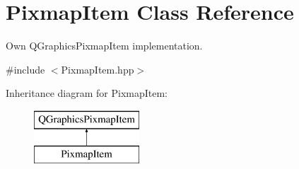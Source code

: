 \hypertarget{classPixmapItem}{}\section{Pixmap\+Item Class Reference}
\label{classPixmapItem}


Own Q\+Graphics\+Pixmap\+Item implementation.  




{\ttfamily \#include $<$Pixmap\+Item.\+hpp$>$}

Inheritance diagram for Pixmap\+Item\+:\begin{figure}[H]
\begin{center}
\leavevmode
\includegraphics[height=2.000000cm]{classPixmapItem}
\end{center}
\end{figure}
